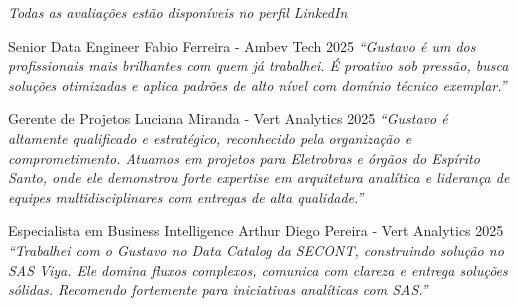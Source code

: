 
\textit{ \small Todas as avaliações estão disponíveis no perfil LinkedIn}

\begin{cventries}

  \cventry
    {Senior Data Engineer} %
    {Fabio Ferreira - Ambev Tech} %
    {2025} %
    {} %
    {
      \textit{``Gustavo é um dos profissionais mais brilhantes com quem já trabalhei. É proativo sob pressão, busca soluções otimizadas e aplica padrões de alto nível com domínio técnico exemplar.''}
    }

  \cventry
    {Gerente de Projetos} %
    {Luciana Miranda - Vert Analytics} %
    {2025} %
    {} %
    {
      \textit{``Gustavo é altamente qualificado e estratégico, reconhecido pela organização e comprometimento. Atuamos em projetos para Eletrobras e órgãos do Espírito Santo, onde ele demonstrou forte expertise em arquitetura analítica e liderança de equipes multidisciplinares com entregas de alta qualidade.''}
    }

  \cventry
    {Especialista em Business Intelligence} %
    {Arthur Diego Pereira - Vert Analytics} %
    {2025} %
    {} %
    {
      \textit{``Trabalhei com o Gustavo no Data Catalog da SECONT, construindo solução no SAS Viya. Ele domina fluxos complexos, comunica com clareza e entrega soluções sólidas. Recomendo fortemente para iniciativas analíticas com SAS.''}
    }


\end{cventries}
